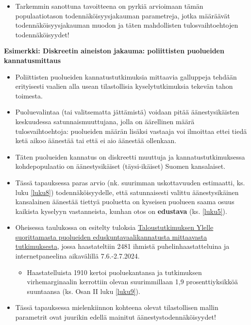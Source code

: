 \documentclass[
]{book}
\providecommand{\tightlist}{%
  \setlength{\itemsep}{0pt}\setlength{\parskip}{0pt}}
\begin{document}
\begin{itemize}
\begin{itemize}
    \begin{itemize}
    \tightlist
    \item
      Tarkemmin sanottuna tavoitteena on pyrkiä arvioimaan tämän populaatiotason todennäköisyysjakauman parametreja, jotka määräävät todennäköisyysjakauman muodon ja täten mahdollisten tulosvaihtoehtojen todennäköisyydet!
    \end{itemize}
  \end{itemize}
\end{itemize}

\begin{eblock}{}

\textbf{Esimerkki: Diskreetin aineiston jakauma: poliittisten puolueiden kannatusmittaus}

\begin{itemize}
\tightlist
\item
  Poliittisten puolueiden kannatustutkimuksia mittaavia galluppeja tehdään erityisesti vaalien alla usean tilastollisia kyselytutkimuksia tekevän tahon toimesta.\\
\item
  Puoluevalintaa (tai valitsematta jättämistä) voidaan pitää äänestysikäisten keskuudessa satunnaismuuttujana, jolla on äärellinen määrä tulosvaihtoehtoja: puolueiden määrän lisäksi vastaaja voi ilmoittaa ettei tiedä ketä aikoo äänestää tai että ei aio äänestää ollenkaan.
\item
  Täten puolueiden kannatus on diskreetti muuttuja ja kannatustutkimuksessa kohdepopulaatio on äänestysikäiset (täysi-ikäiset) Suomen kansalaiset.
\item
  Tässä tapauksessa paras arvio (nk. suurimman uskottavuuden estimaatti, ks. luku \ref{luku8}) todennäköisyydelle, että satunnaisesti valittu äänestysikäinen kansalainen äänestää tiettyä puoluetta on kyseisen puolueen saama osuus kaikista kyselyyn vastanneista, kunhan otos on \textbf{edustava} (ks. \ref{luku5}).
\item
  Oheisessa taulukossa on esitelty tuloksia \href{https://yle.fi/a/74-20096107}{Taloustutkimuksen Ylelle suorittamasta puolueiden eduskuntavaalikannatusta mittaavasta tutkimuksesta}, jossa haastateltiin 2481 ihmistä puhelinhaastatteluina ja internetpaneelina aikavälillä 7.6.-2.7.2024.

  \begin{itemize}
  \tightlist
  \item
    Haastatelluista 1910 kertoi puoluekantansa ja tutkimuksen virhemarginaalin kerrottiin olevan suurimmillaan 1,9 prosenttiyksikköä suuntaansa (ks. Osan II luku \ref{luku9}).
  \end{itemize}
\item
  Tässä tapauksessa mielenkiinnon kohteena olevat tilastollisen mallin parametrit ovat juurikin edellä mainitut äänestystodennäköisyydet!


\end{itemize}
\end{eblock}
\end{document}
